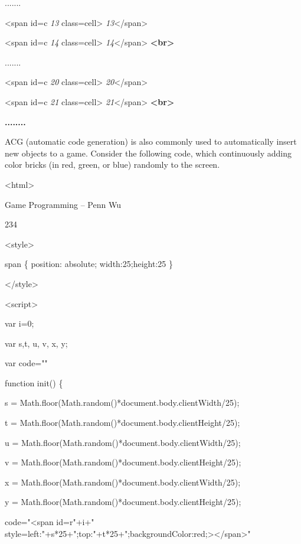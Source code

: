 \documentclass[
]{article}
\begin{document}
.......

\textless span id=c \emph{13}
class=\textquotesingle cell\textquotesingle\textgreater{}
\emph{13}\textless/span\textgreater{}

\textless span id=c \emph{14}
class=\textquotesingle cell\textquotesingle\textgreater{}
\emph{14}\textless/span\textgreater{}
\textbf{\textless br\textgreater{}}

.......

\textless span id=c \emph{20}
class=\textquotesingle cell\textquotesingle\textgreater{}
\emph{20}\textless/span\textgreater{}

\textless span id=c \emph{21}
class=\textquotesingle cell\textquotesingle\textgreater{}
\emph{21}\textless/span\textgreater{}
\textbf{\textless br\textgreater{}}

\textbf{........}

ACG (automatic code generation) is also commonly used to automatically
insert new objects to a game. Consider the following code, which
continuously adding color bricks (in red, green, or blue) randomly to
the screen.

\textless html\textgreater{}

Game Programming -- Penn Wu

234

\protect\hypertarget{index_split_012.htmlux5cux23p235}{}{}\textless style\textgreater{}

span \{ position: absolute; width:25;height:25 \}

\textless/style\textgreater{}

\textless script\textgreater{}

var i=0;

var s,t, u, v, x, y;

var code=""

function init() \{

s = Math.floor(Math.random()*document.body.clientWidth/25);

t = Math.floor(Math.random()*document.body.clientHeight/25);

u = Math.floor(Math.random()*document.body.clientWidth/25);

v = Math.floor(Math.random()*document.body.clientHeight/25);

x = Math.floor(Math.random()*document.body.clientWidth/25);

y = Math.floor(Math.random()*document.body.clientHeight/25);

code="\textless span id=r"+i+"
style=\textquotesingle left:"+s*25+";top:"+t*25+";backgroundColor:red;\textquotesingle\textgreater\textless/span\textgreater"
\end{document}
